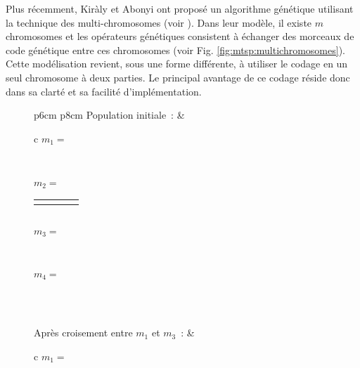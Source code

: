   
  Plus récemment, Kiràly et Abonyi ont proposé un algorithme génétique utilisant la technique des multi-chromosomes (voir \cite{Kiraly2011}). Dans leur modèle, il existe $m$ chromosomes et les opérateurs génétiques consistent à échanger des morceaux de code génétique entre ces chromosomes (voir Fig. \ref{fig:mtsp:multichromosomes}). Cette modélisation revient, sous une forme différente, à utiliser le codage en un seul chromosome à deux parties. Le principal avantage de ce codage réside donc dans sa clarté et sa facilité d'implémentation.\\
  
\begin{figure}
 \centering
 \begin{tabular}{p{6cm} p{8cm}}
   \small Population initiale~: & \begin{tabular}{c}
    $m_1=$
   \begin{tabular}{|p{0.5cm}|p{0.5cm}|p{0.5cm}|p{0.5cm}|}
    \hline 
      \centering 2 & \centering 5 & \centering 14 & \centering 6 \tabularnewline
    \hline
   \end{tabular}\\
   $m_2=$ \begin{tabular}{|p{0.5cm}|p{0.5cm}|p{0.5cm}|p{0.5cm}}
    \cline{1-3}
     \centering 1 & \centering 11 & \centering 8 & \tabularnewline
    \cline{1-3}
   \end{tabular}\\
   $m_3=$ \begin{tabular}{|p{0.5cm}|p{0.5cm}|p{0.5cm}|p{0.5cm}|}
    \hline
     \centering 4 & \centering 10 & \centering 3 & \centering 13 \tabularnewline
    \hline
   \end{tabular}\\
   $m_4=$ \begin{tabular}{|p{0.5cm}|p{0.5cm}|p{0.5cm}|p{0.5cm}|}
   \hline
    \centering 12 & \centering 15 & \centering 9 & \centering 7 \tabularnewline
   \hline
   \end{tabular}\\
  \end{tabular}
  \tabularnewline
  \tabularnewline
  \small Après croisement entre $m_1$ et $m_3$~: & \begin{tabular}{c}
   $m_1=$
   \begin{tabular}{|p{0.5cm}|p{0.5cm}|p{0.5cm}|p{0.5cm}|p{0.5cm}|}
    \hline 
      \centering 2 & \centering 5 & \centering 10 & \centering 3 & \centering 13 \tabularnewline
    \hline
   \end{tabular}\\

\end{tabular}
\end{tabular}
\end{figure}
